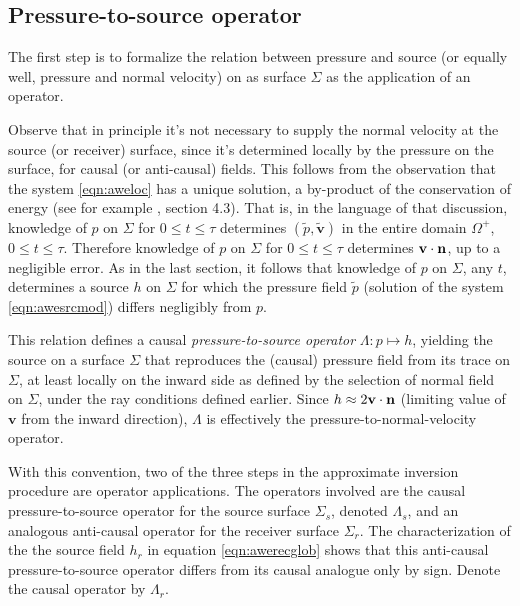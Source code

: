 \documentclass[12pt]{geophysics}
\newcommand{\bv}{\mathbf{v}}
\begin{document}
\subsection{Pressure-to-source operator}
The first step is to formalize the relation between pressure and
source (or equally well, pressure and normal velocity) on as surface
$\Sigma$ as the application of an operator.

Observe that in principle it's not necessary to
supply the normal velocity at the source (or receiver) surface, since
it's determined locally by the pressure on the surface, for causal (or
anti-causal) fields. This follows from the observation that the system
\ref{eqn:aweloc} has a unique solution, a by-product of the
conservation of energy (see for example \cite{Lax:PDENotes}, section
4.3). That is, in the language of that discussion, knowledge of $p$ on
$\Sigma$ for $0\le t \le \tau$ determines $(\tilde{p},\tilde{\bv})$ in
the entire domain $\Omega^+$, $0\le t \le \tau$. Therefore knowledge
of $p$ on $\Sigma$ for $0\le t \le \tau$ determines
$\bv \cdot {\bf n}$, up to a negligible error. As in the last section,
it follows that knowledge of $p$ on $\Sigma$, any $t$, determines a
source $h$ on $\Sigma$ for which the pressure field $\tilde{p}$
(solution of the system \ref{eqn:awesrcmod}) differs negligibly from
$p$.

This relation defines a causal {\em pressure-to-source operator}
$\Lambda: p \mapsto h$, yielding the source on a surface $\Sigma$ that
reproduces the (causal) pressure field from its trace on $\Sigma$, at
least locally on the inward side as defined by the selection of normal
field on $\Sigma$, under the ray conditions defined earlier. Since
$h \approx 2 \bv \cdot {\bf n}$ (limiting value of $\bv$ from the
inward direction), $\Lambda$ is effectively the
pressure-to-normal-velocity operator.

With this convention, two of the three steps in
the approximate inversion procedure are operator applications. The
operators involved are the causal pressure-to-source operator for the
source surface $\Sigma_s$, denoted $\Lambda_s$, and an analogous
anti-causal operator for the receiver surface $\Sigma_r$. 
The characterization of the the source field $h_r$ in equation
\ref{eqn:awerecglob} shows that this anti-causal pressure-to-source
operator differs from its causal analogue only by sign. Denote the
causal operator by $\Lambda_r$.
\end{document}
